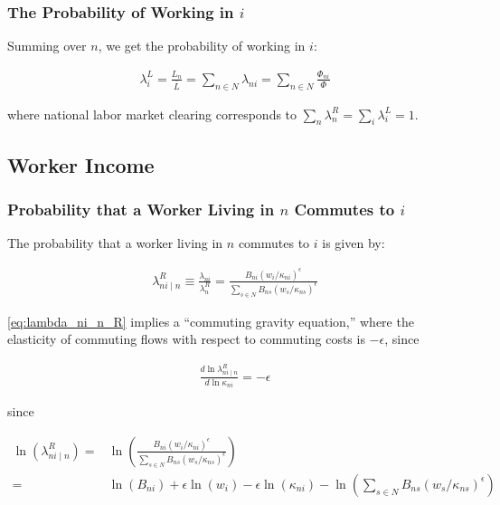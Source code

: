\documentclass[10pt]{article}
\begin{document}
\subsubsection{The Probability of Working in $i$}

Summing over $n$, we get the probability of working in $i$:

\begin{align}
    \lambda_i^L=\frac{L_n}{\bar{L}}=\sum_{n \in N} \lambda_{n i}=\sum_{n \in N} \frac{\Phi_{n i}}{\Phi} \label{eq:lambda_i_L}
\end{align}

where national labor market clearing 
corresponds to $\sum_n \lambda_n^R=\sum_i \lambda_i^L=1$.



\subsection{Worker Income}

\subsubsection{Probability that a Worker Living in $n$ Commutes to $i$}

The probability that a worker living in $n$ commutes to $i$ is given by:

\begin{align}
    \lambda_{n i \mid n}^R \equiv \frac{\lambda_{n i}}{\lambda_n^R}=\frac{B_{n i}\left(w_i / \kappa_{n i}\right)^\epsilon}{\sum_{s \in N} B_{n s}\left(w_s / \kappa_{n s}\right)^\epsilon} \label{eq:lambda_ni_n_R}
\end{align}

\eqref{eq:lambda_ni_n_R} implies a 
``commuting gravity equation,''
where the elasticity of commuting flows
with respect to commuting costs 
is $-\epsilon$, since

\begin{align}
    \frac{d \ln \lambda_{n i \mid n}^R}{d \ln \kappa_{n i}}=-\epsilon
\end{align}

since 

\begin{align}
    \ln \left(\lambda_{n i \mid n}^R\right) = &\ln \left(\frac{B_{n i}\left(w_i / \kappa_{n i}\right)^\epsilon}{\sum_{s \in N} B_{n s}\left(w_s / \kappa_{n s}\right)^\epsilon}\right) \\
    = &\ln(B_{ni}) + \epsilon \ln(w_i) - \epsilon \ln(\kappa_{ni}) - \ln\left(\sum_{s \in N} B_{n s}\left(w_s / \kappa_{n s}\right)^\epsilon\right) \\
\end{align}
\end{document}

